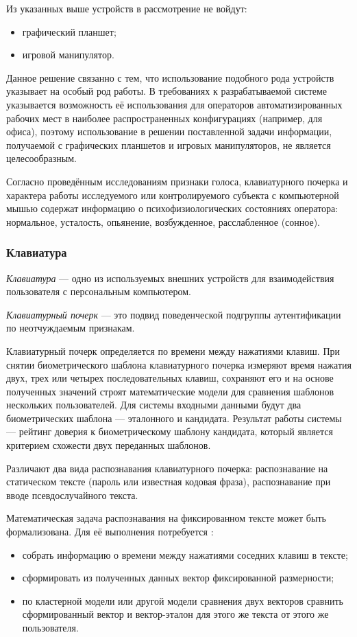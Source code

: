 Из указанных выше устройств в рассмотрение не войдут:
\begin{itemize}[leftmargin=1.6\parindent]
\item графический планшет;
\item игровой манипулятор.
\end{itemize}

Данное решение связанно с тем, что использование подобного рода устройств указывает на особый род работы. В требованиях к разрабатываемой системе указывается возможность её использования для операторов автоматизированных рабочих мест в наиболее распространенных  конфигурациях (например, для офиса), поэтому использование в решении поставленной задачи информации, получаемой с графических планшетов и игровых манипуляторов, не является целесообразным.

Согласно проведённым исследованиям \cite{recognitionOfPsycho} признаки голоса, клавиатурного почерка и характера работы исследуемого или контролируемого субъекта с компьютерной мышью содержат информацию о психофизиологических состояниях оператора: нормальное, усталость, опьянение, возбужденное, расслабленное (сонное).

\subsubsection{Клавиатура}
\textit{Клавиатура} --- одно из используемых внешних устройств для взаимодействия пользователя с персональным компьютером.

\textit{Клавиатурный почерк} --- это подвид поведенческой подгруппы аутентификации по неотчуждаемым признакам. \cite{keystroke}

Клавиатурный почерк определяется по времени между нажатиями клавиш. При снятии биометрического шаблона клавиатурного почерка измеряют время нажатия двух, трех или четырех последовательных клавиш, сохраняют его и на основе полученных значений строят математические модели для сравнения шаблонов нескольких пользователей. \cite{intrusionDetection} Для системы входными данными будут два биометрических шаблона --- эталонного и кандидата. Результат работы системы --- рейтинг доверия к биометрическому шаблону кандидата, который является критерием схожести двух переданных шаблонов.

Различают два вида распознавания клавиатурного почерка: распознавание на статическом тексте (пароль или известная кодовая фраза), распознавание при вводе псевдослучайного текста. \cite{keystroke}

Математическая задача распознавания на фиксированном тексте может быть формализована. Для её выполнения потребуется \cite{keystroke}:
\begin{itemize}
\item собрать информацию о времени между нажатиями соседних клавиш в тексте;
\item сформировать из полученных данных вектор фиксированной размерности;
\item по кластерной модели или другой модели сравнения двух векторов сравнить сформированный вектор и вектор-эталон для этого же текста от этого же пользователя.
\end{itemize}

